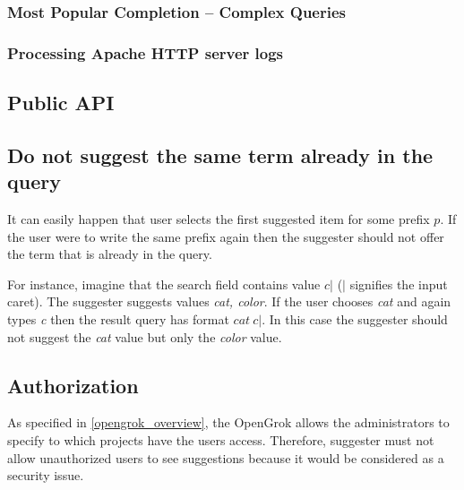 \subsubsection{Most Popular Completion – Complex Queries}
\label{previous_searches}

\subsubsection{Processing Apache HTTP server logs}

\subsection{Public API}

\subsection{Do not suggest the same term already in the query}
It can easily happen that user selects the first suggested item for some prefix $p$. If the user were to write the same
prefix again then the suggester should not offer the term that is already in the query.

For instance, imagine that the search field contains value $c\vert$ ($\vert$ signifies the input caret). The suggester
suggests values \textit{cat, color}. If the user chooses \textit{cat} and again types \textit{c} then the result
query has format $cat\ c\vert$. In this case the suggester should not suggest the \textit{cat} value but only the \textit{color}
value.

\subsection{Authorization}
As specified in \ref{opengrok_overview}, the OpenGrok allows the administrators to specify to which projects have the users
access. Therefore, suggester must not allow unauthorized users to see suggestions because it would be considered as a security issue.

